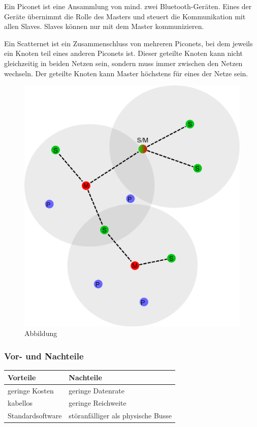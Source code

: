     Ein Piconet ist eine Ansammlung von mind. zwei Bluetooth-Geräten. Eines der Geräte übernimmt die Rolle des Masters und steuert die Kommunikation mit allen Slaves. Slaves können nur mit dem Master kommunizieren.
    
    Ein Scatternet ist ein Zusammenschluss von mehreren Piconets, bei dem jeweils ein Knoten teil eines anderen Piconets ist. Dieser geteilte Knoten kann nicht gleichzeitig in beiden Netzen sein, sondern muss immer zwischen den Netzen wechseln. Der geteilte Knoten kann Master höchstens für eines der Netze sein.
    
    \begin{figure}[h!]
        \centering
        \includegraphics[width=0.5\linewidth]{pico_scatternet.png}
        \caption{Abbildung  \cite{.MH_Scatter}}
    \end{figure}
    
    \subsubsection{Vor- und Nachteile}
    \begin{tabular}{l|l}
        \textbf{Vorteile} & \textbf{Nachteile}\\
        \hline geringe Kosten & geringe Datenrate\\
        \hline kabellos & geringe Reichweite\\
        \hline Standardsoftware & störanfälliger als physische Busse\\
    \end{tabular}
